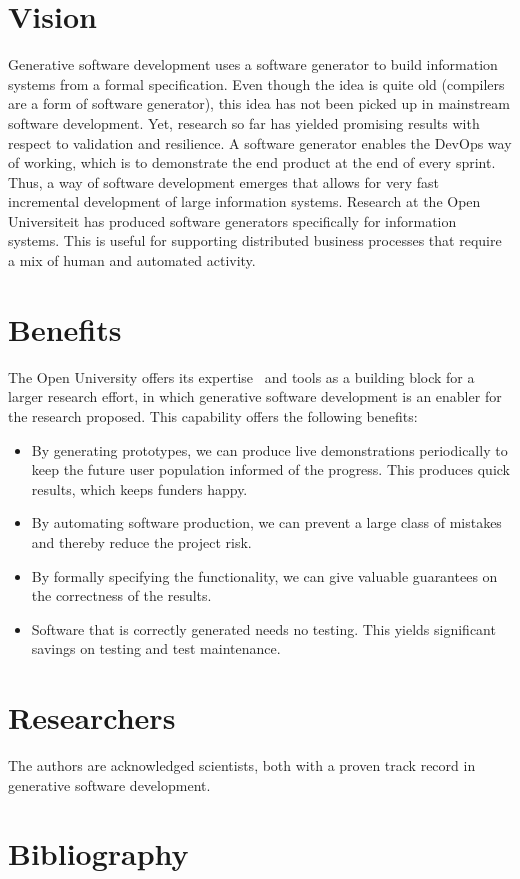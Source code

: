 \documentclass{elsarticle}
\begin{document}
\section{Vision}
   Generative software development uses a software generator to build information systems from a formal specification.
   Even though the idea is quite old (compilers are a form of software generator),
   this idea has not been picked up in mainstream software development.
   Yet, research so far has yielded promising results with respect to validation and resilience.
   A software generator enables the DevOps way of working, which is to demonstrate the end product at the end of every sprint.
   Thus, a way of software development emerges that allows for very fast incremental development of large information systems.
   Research at the Open Universiteit has produced software generators specifically for information systems.
   This is useful for supporting distributed business processes that require a mix of human and automated activity.

\section{Benefits}
    The Open University offers its expertise~\cite{Joosten-JLAMP2018,JoostenRAMiCS2017,10.1145/3354166.3354182} and tools as a building block for a larger research effort,
    in which generative software development is an enabler for the research proposed.
    This capability offers the following benefits:
\begin{itemize}
    \item By generating prototypes, we can produce live demonstrations periodically to keep the future user population informed of the progress.
    This produces quick results, which keeps funders happy.
    \item By automating software production, we can prevent a large class of mistakes and thereby reduce the project risk.
    \item By formally specifying the functionality, we can give valuable guarantees on the correctness of the results.
    \item Software that is correctly generated needs no testing. This yields significant savings on testing and test maintenance.
\end{itemize}

\section{Researchers}
    The authors are acknowledged scientists, both with a proven track record in generative software development.

    \section{Bibliography}


    
\end{document}
